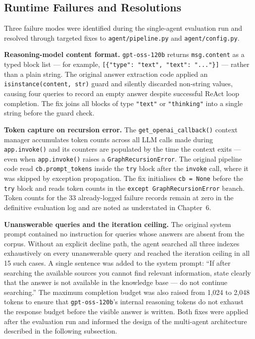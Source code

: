 \subsection{Runtime Failures and Resolutions}

Three failure modes were identified during the single-agent evaluation run and resolved through targeted fixes to \texttt{agent/pipeline.py} and \texttt{agent/config.py}.

\textbf{Reasoning-model content format.} \texttt{gpt-oss-120b} returns \texttt{msg.content} as a typed block list — for example, \texttt{[\{"type": "text", "text": "..."\}]} — rather than a plain string. The original answer extraction code applied an \texttt{isinstance(content, str)} guard and silently discarded non-string values, causing four queries to record an empty answer despite successful ReAct loop completion. The fix joins all blocks of type \texttt{"text"} or \texttt{"thinking"} into a single string before the guard check.

\textbf{Token capture on recursion error.} The \texttt{get\_openai\_callback()} context manager accumulates token counts across all LLM calls made during \texttt{app.invoke()} and its counters are populated by the time the context exits — even when \texttt{app.invoke()} raises a \texttt{GraphRecursionError}. The original pipeline code read \texttt{cb.prompt\_tokens} inside the \texttt{try} block after the \texttt{invoke} call, where it was skipped by exception propagation. The fix initialises \texttt{cb = None} before the \texttt{try} block and reads token counts in the \texttt{except GraphRecursionError} branch. Token counts for the 33 already-logged failure records remain at zero in the definitive evaluation log and are noted as understated in Chapter~6.

\textbf{Unanswerable queries and the iteration ceiling.} The original system prompt contained no instruction for queries whose answers are absent from the corpus. Without an explicit decline path, the agent searched all three indexes exhaustively on every unanswerable query and reached the iteration ceiling in all 15 such cases. A single sentence was added to the system prompt: ``If after searching the available sources you cannot find relevant information, state clearly that the answer is not available in the knowledge base — do not continue searching.'' The maximum completion budget was also raised from 1,024 to 2,048 tokens to ensure that \texttt{gpt-oss-120b}'s internal reasoning tokens do not exhaust the response budget before the visible answer is written. Both fixes were applied after the evaluation run and informed the design of the multi-agent architecture described in the following subsection.

